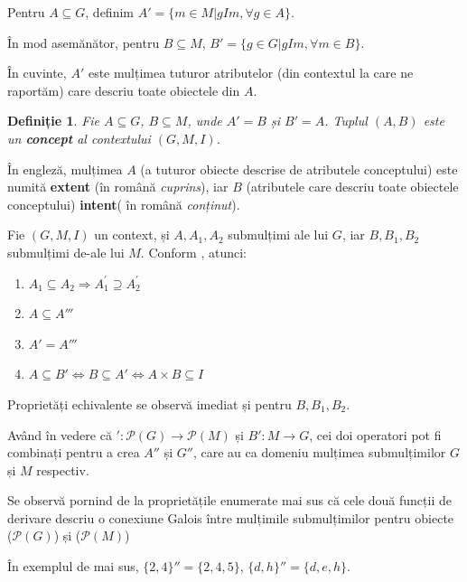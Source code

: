 \documentclass[12pt, a4paper, twoside, romanian]{teza-upb}
\newtheorem{defn}{Definiție}
\begin{document}
    Pentru $A \subseteq G$, definim
    $ A' = \{m \in M | gIm, \forall g \in A\} $.

    În mod asemănător, pentru $B \subseteq M$, $B' = \{g \in G | gIm, \forall m \in B \}$.

    În cuvinte, $A'$ este mulțimea tuturor atributelor (din contextul la care ne raportăm) care descriu toate obiectele din $A$.

    \begin{defn}
      Fie $A \subseteq G$, $B \subseteq M$, unde $A' = B$ și $B' = A$. Tuplul $(A, B)$ este un \textbf{concept} al contextului $(G, M, I)$.
    \end{defn}

    În engleză, mulțimea $A$ (a tuturor obiecte descrise de atributele conceptului) este numită \textbf{extent} (în română \textit{cuprins}), iar $B$ (atributele care descriu toate obiectele conceptului) \textbf{intent}( în română \textit{conținut}).


Fie $(G, M, I)$ un context, și $A, A_1, A_2$ submulțimi ale lui $G$, iar $B, B_1, B_2$ submulțimi de-ale lui $M$. Conform \cite{Ganter:1997:FCA:550737}, atunci:

    \begin{enumerate}
        \item $A_1 \subseteq A_2 \Rightarrow A^{'}_{1} \supseteq A^{'}_2$
        \item $A  \subseteq A'''$
        \item $A' = A'''$
        \item $A \subseteq B' \Longleftrightarrow B \subseteq A' \Longleftrightarrow A \times B \subseteq I$
    \end{enumerate}

    Proprietăți echivalente se observă imediat și pentru $B, B_1, B_2$.

    Având în vedere că $ ': \mathcal P \left(G \right) \rightarrow \mathcal P \left(M\right)$ și $B' : M \rightarrow G$, cei doi operatori pot fi combinați pentru a crea $A''$ și $G''$, care au ca domeniu mulțimea submulțimilor $G$ și $M$ respectiv. 

    Se observă pornind de la proprietățile enumerate mai sus că cele două funcții de derivare descriu o conexiune Galois între mulțimile submulțimilor pentru obiecte ($\mathcal P \left(G \right)$) și ($\mathcal P \left( M \right) $)

    În exemplul de mai sus, $\{2, 4\}'' = \{2, 4, 5\}$, $\{d, h\}'' = \{d, e, h \}$.
\end{document}
